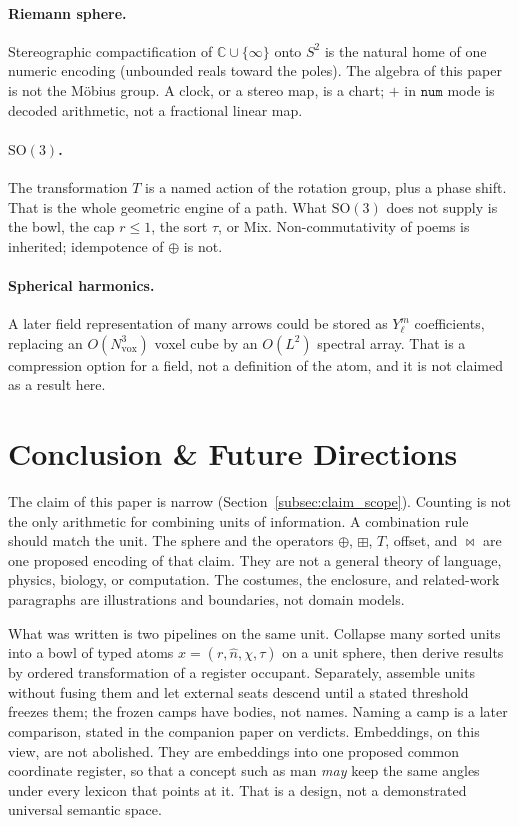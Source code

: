 \documentclass[12pt, a4paper]{article}
\begin{document}
\paragraph{Riemann sphere.}
Stereographic compactification of $\mathbb{C}\cup\{\infty\}$ onto $S^2$
is the natural home of one numeric encoding (unbounded reals toward the
poles). The algebra of this paper is not the M\"obius group. A clock,
or a stereo map, is a chart; $+$ in $\mathtt{num}$ mode is decoded
arithmetic, not a fractional linear map.

\paragraph{$\mathrm{SO}(3)$.}
The transformation $T$ is a named action of the rotation group, plus a
phase shift. That is the whole geometric engine of a path. What
$\mathrm{SO}(3)$ does not supply is the bowl, the cap $r\le 1$, the
sort $\tau$, or Mix. Non-commutativity of poems is inherited;
idempotence of $\oplus$ is not.

\paragraph{Spherical harmonics.}
A later field representation of many arrows could be stored as
$Y_\ell^m$ coefficients, replacing an $O(N_{\mathrm{vox}}^3)$ voxel cube by an
$O(L^2)$ spectral array. That is a compression option for a field, not
a definition of the atom, and it is not claimed as a result here.

\section{Conclusion \& Future Directions}
\label{sec:conclusion}

The claim of this paper is narrow
(Section~\ref{subsec:claim_scope}). Counting is not the only
arithmetic for combining units of information. A combination rule
should match the unit. The sphere and the operators
$\oplus$, $\boxplus$, $T$, offset, and $\bowtie$ are one proposed
encoding of that claim. They are not a general theory of language,
physics, biology, or computation. The costumes, the enclosure, and
related-work paragraphs are illustrations and boundaries, not domain
models.

What was written is two pipelines on the same unit. Collapse many
sorted units into a bowl of typed atoms $x=(r,\hat n,\chi,\tau)$ on a
unit sphere, then derive results by ordered transformation of a
register occupant. Separately, assemble units without fusing them
and let external seats descend until a stated threshold freezes
them; the frozen camps have bodies, not names. Naming a camp is a later comparison, stated in the companion
paper on verdicts.
Embeddings, on this view, are
not abolished. They are embeddings into one proposed common coordinate
register, so that a
concept such as $\mathrm{man}$ \emph{may} keep the same angles under every
lexicon that points at it. That is a design, not a demonstrated
universal semantic space.
\end{document}
